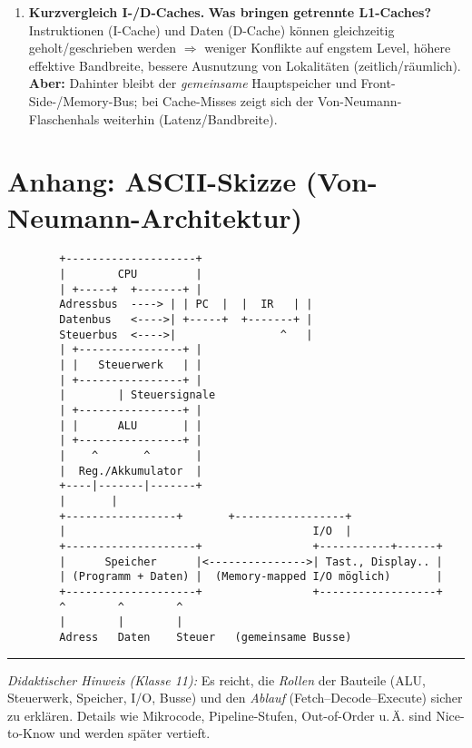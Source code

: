 \documentclass[11pt,a4paper]{scrartcl}
\begin{document}
\begin{enumerate}[leftmargin=*,label=\textbf{Aufgabe~\arabic*:}, itemsep=0.9em, start=1]
		\item \textbf{Kurzvergleich I-/D-Caches.}\quad
		\textbf{Was bringen getrennte L1-Caches?} Instruktionen (I-Cache) und Daten (D-Cache) können gleichzeitig geholt/geschrieben werden \(\Rightarrow\) weniger Konflikte auf engstem Level, höhere effektive Bandbreite, bessere Ausnutzung von Lokalitäten (zeitlich/räumlich).\\
		\textbf{Aber:} Dahinter bleibt der \emph{gemeinsame} Hauptspeicher und Front-Side-/Memory-Bus; bei Cache-Misses zeigt sich der Von-Neumann-Flaschenhals weiterhin (Latenz/Bandbreite).
	\end{enumerate}
	
	\section*{Anhang: ASCII-Skizze (Von-Neumann-Architektur)}
	\begin{verbatim}
		+--------------------+
		|        CPU         |
		| +-----+  +-------+ |
		Adressbus  ----> | | PC  |  |  IR   | |
		Datenbus   <---->| +-----+  +-------+ |
		Steuerbus  <---->|                ^   |
		| +----------------+ |
		| |   Steuerwerk   | |
		| +----------------+ |
		|        | Steuersignale
		| +----------------+ |
		| |      ALU       | |
		| +----------------+ |
		|    ^       ^       |
		|  Reg./Akkumulator  |
		+----|-------|-------+
		|       |
		+-----------------+       +-----------------+
		|                                      I/O  |
		+--------------------+                 +-----------+------+
		|      Speicher      |<--------------->| Tast., Display.. |
		| (Programm + Daten) |  (Memory-mapped I/O möglich)       |
		+--------------------+                 +------------------+
		^        ^        ^
		|        |        |
		Adress   Daten    Steuer   (gemeinsame Busse)
	\end{verbatim}
	
	
	\vfill
	\hrule
	\small\emph{Didaktischer Hinweis (Klasse 11):} Es reicht, die \emph{Rollen} der Bauteile (ALU, Steuerwerk, Speicher, I/O, Busse) und den \emph{Ablauf} (Fetch–Decode–Execute) sicher zu erklären. Details wie Mikrocode, Pipeline-Stufen, Out-of-Order u.\,Ä. sind Nice-to-Know und werden später vertieft.
	
\end{document}
